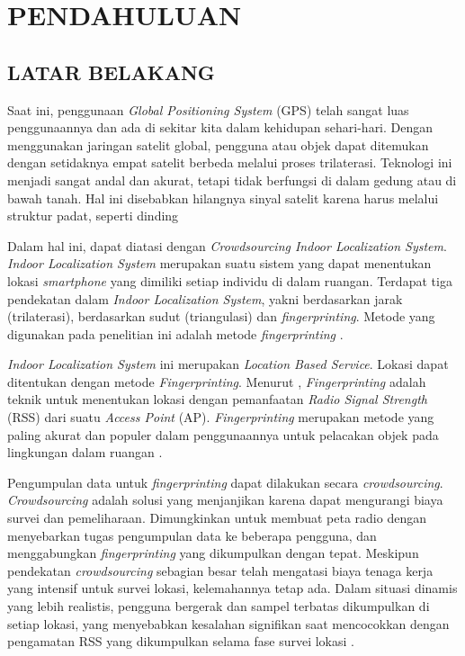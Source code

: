 \fancyhf{}
\fancyfoot[C]{\thepage}


\chapter{PENDAHULUAN}

\section{\uppercase{LATAR BELAKANG}}


\par Saat ini, penggunaan \textit{Global Positioning System} (GPS) telah sangat luas penggunaannya dan ada di sekitar kita dalam kehidupan sehari-hari. Dengan menggunakan jaringan satelit global, pengguna atau objek dapat ditemukan dengan setidaknya empat satelit berbeda melalui proses trilaterasi. Teknologi ini menjadi sangat andal dan akurat, tetapi tidak berfungsi di dalam gedung atau di bawah tanah. Hal ini disebabkan hilangnya sinyal satelit karena harus melalui struktur padat, seperti dinding \citep{Santos2021}

\par Dalam hal ini, dapat diatasi dengan \textit{Crowdsourcing Indoor Localization System}. \textit{Indoor Localization System} merupakan suatu sistem yang dapat menentukan lokasi \textit{smartphone} yang dimiliki setiap individu di dalam ruangan. Terdapat tiga pendekatan dalam \textit{Indoor Localization System}, yakni berdasarkan jarak (trilaterasi), berdasarkan sudut (triangulasi) dan \textit{fingerprinting}. Metode yang digunakan pada penelitian ini adalah metode \textit{fingerprinting} \citep{Santos2021}.

\par \textit{Indoor Localization System} ini merupakan \textit{Location Based Service}. Lokasi dapat ditentukan dengan metode \textit{Fingerprinting}. Menurut \citep{Muhammad2018}, \textit{Fingerprinting} adalah teknik untuk menentukan lokasi dengan pemanfaatan \textit{Radio Signal Strength} (RSS) dari suatu \textit{Access Point} (AP). \textit{Fingerprinting} merupakan metode yang paling akurat dan populer dalam penggunaannya untuk pelacakan objek pada lingkungan dalam ruangan \citep{Yim2010}.

\par Pengumpulan data untuk \textit{fingerprinting} dapat dilakukan secara \textit{crowdsourcing}. \textit{Crowdsourcing} adalah solusi yang menjanjikan karena dapat mengurangi biaya survei dan pemeliharaan. Dimungkinkan untuk membuat peta radio dengan menyebarkan tugas pengumpulan data ke beberapa pengguna, dan menggabungkan \textit{fingerprinting} yang dikumpulkan dengan tepat. Meskipun pendekatan \textit{crowdsourcing} sebagian besar telah mengatasi biaya tenaga kerja yang intensif untuk survei lokasi, kelemahannya tetap ada.  Dalam situasi dinamis yang lebih realistis, pengguna bergerak dan sampel terbatas dikumpulkan di setiap lokasi, yang menyebabkan kesalahan signifikan saat mencocokkan dengan pengamatan RSS yang dikumpulkan selama fase survei lokasi \citep{Sun2019}.



